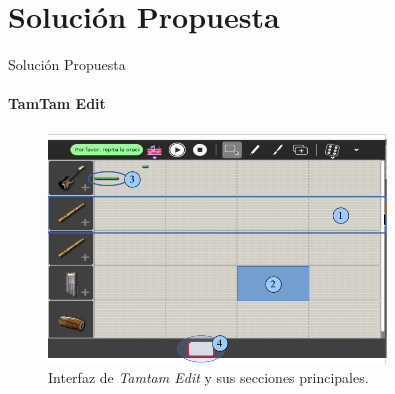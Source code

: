 \section{Soluci\'on Propuesta}

\begin{frame}{Soluci\'on Propuesta}
\framesubtitle{TamTam Edit}

\begin{figure}[H]
\centering
\includegraphics[width=0.8\textwidth]{./graphics/ui-tamtam-edit.png}
\caption{Interfaz de \emph{Tamtam Edit} y sus secciones principales.}
\label{figure:ui-tamtam}
\end{figure}

\end{frame}

